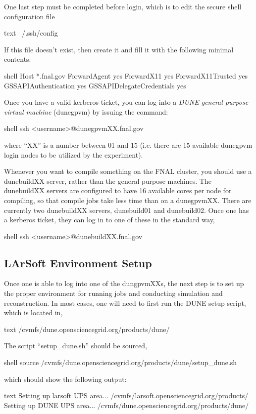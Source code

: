 \documentclass[8pt]{refart}
\begin{document}
One last step must be completed before login, which is to edit the secure shell configuration file
\begin{code}{text}
~/.ssh/config
\end{code}
If this file doesn't exist, then create it and fill it with the following minimal contents:
\begin{code}{shell}
Host *.fnal.gov
ForwardAgent yes
ForwardX11 yes
ForwardX11Trusted yes
GSSAPIAuthentication yes
GSSAPIDelegateCredentials yes
\end{code}
Once you have a valid kerberos ticket, you can log into a \textit{DUNE general purpose virtual machine} (dunegpvm) by issuing the command:
\begin{code}{shell}
ssh <username>@dunegpvmXX.fnal.gov
\end{code}
where ``XX'' is a number between 01 and 15 (i.e. there are 15 available dunegpvm login nodes to be utilized by the experiment).

Whenever you want to compile something on the FNAL cluster, you should use a dunebuildXX server, rather than the general purpose machines.  The dunebuildXX servers are configured to have 16 available cores per node for compiling, so that compile jobs take less time than on a dunegpvmXX.  There are currently two dunebuildXX servers, dunebuild01 and dunebuild02.  Once one has a kerberos ticket, they can log in to one of these in the standard way,
\begin{code}{shell}
ssh <username>@dunebuildXX.fnal.gov
\end{code}


\subsection{LArSoft Environment Setup}\label{larsoftsetup}
Once one is able to log into one of the dungpvmXXs, the next step is to set up the proper environment for running jobs and conducting simulation and reconstruction.  In most cases, one will need to first run the DUNE setup script, which is located in,
\begin{code}{text}
/cvmfs/dune.opensciencegrid.org/products/dune/
\end{code}
The script ``setup\_dune.sh'' should be sourced,
\begin{code}{shell}
source /cvmfs/dune.opensciencegrid.org/products/dune/setup_dune.sh
\end{code}
which should show the following output:
\begin{code}{text}
Setting up larsoft UPS area... /cvmfs/larsoft.opensciencegrid.org/products/
Setting up DUNE UPS area... /cvmfs/dune.opensciencegrid.org/products/dune/
\end{code}
\end{document}

